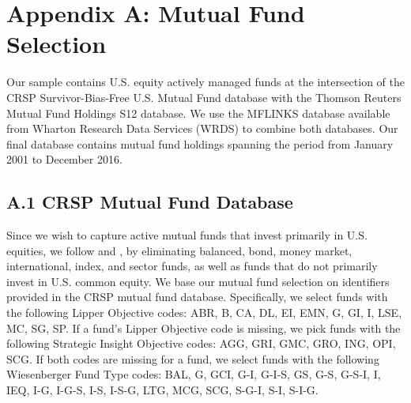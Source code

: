 
\section*{Appendix A: Mutual Fund Selection}
\par Our sample contains U.S. equity actively managed funds at the intersection of the CRSP Survivor-Bias-Free U.S. Mutual Fund database with the Thomson Reuters Mutual Fund Holdings S12 database. We use the MFLINKS database available from Wharton Research Data Services (WRDS) to combine both databases. Our final database contains mutual fund holdings spanning the period from January 2001 to December 2016. 
\subsection*{A.1 \hspace{0.1cm} CRSP Mutual Fund Database }
Since we wish to capture active mutual funds that invest primarily in U.S. equities, we follow \citet{kacperczyk2008unobserved} and  \citet{lou2012flow}, by eliminating balanced, bond, money market, international, index, and sector funds, as well as funds that do not primarily invest in U.S. common equity. We base our mutual fund selection on identifiers provided in the CRSP mutual fund database. Specifically, we select funds with the following Lipper Objective codes: ABR, B, CA, DL, EI, EMN, G, GI, I, LSE, MC, SG, SP. If a fund's Lipper Objective code is missing, we pick funds with the following Strategic Insight Objective codes:  AGG, GRI, GMC, GRO, ING, OPI, SCG. If both codes are missing for a fund, we select funds with the following Wiesenberger Fund Type codes: BAL, G, GCI, G-I, G-I-S, GS, G-S, G-S-I, I, IEQ, I-G, I-G-S, I-S, I-S-G, LTG, MCG, SCG, S-G-I, S-I, S-I-G.  
